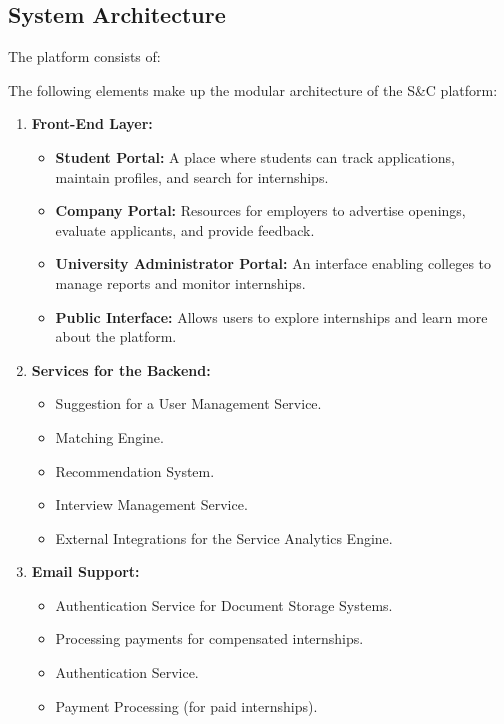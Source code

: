 \subsection{System Architecture}

The platform consists of:

The following elements make up the modular architecture of the S\&C platform:

\begin{enumerate}
    \item \textbf{Front-End Layer:}
    \begin{itemize}
        \item \textbf{Student Portal:} A place where students can track applications, maintain profiles, and search for internships.
        \item \textbf{Company Portal:} Resources for employers to advertise openings, evaluate applicants, and provide feedback.
        \item \textbf{University Administrator Portal:} An interface enabling colleges to manage reports and monitor internships.
        \item \textbf{Public Interface:} Allows users to explore internships and learn more about the platform.
    \end{itemize}
    
    \item \textbf{Services for the Backend:}
    \begin{itemize}
        \item Suggestion for a User Management Service.
        \item Matching Engine.
        \item Recommendation System.
        \item Interview Management Service.
        \item External Integrations for the Service Analytics Engine.
    \end{itemize}
    
    \item \textbf{Email Support:}
    \begin{itemize}
        \item Authentication Service for Document Storage Systems.
        \item Processing payments for compensated internships.
        \item Authentication Service.
        \item Payment Processing (for paid internships).
    \end{itemize}
\end{enumerate}

